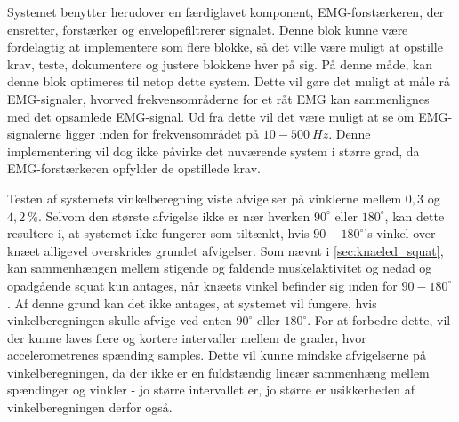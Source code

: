 
Systemet benytter herudover en færdiglavet komponent, EMG-forstærkeren, der ensretter, forstærker og envelopefiltrerer signalet. Denne blok kunne være fordelagtig at implementere som flere blokke, så det ville være muligt at opstille krav, teste, dokumentere og justere blokkene hver på sig. På denne måde, kan denne blok optimeres til netop dette system. Dette vil gøre det muligt at måle rå EMG-signaler, hvorved frekvensområderne for et råt EMG kan sammenlignes med det opsamlede EMG-signal. Ud fra dette vil det være muligt at se om EMG-signalerne ligger inden for frekvensområdet på $10-500~Hz$. Denne implementering vil dog ikke påvirke det nuværende system i større grad, da EMG-forstærkeren opfylder de opstillede krav. %

Testen af systemets vinkelberegning viste afvigelser på vinklerne mellem $0,3$ og $4,2~\%$. Selvom den største afvigelse ikke er nær hverken $90^{\circ}$ eller $180^{\circ}$, kan dette resultere i, at systemet ikke fungerer som tiltænkt, hvis $90-180^{\circ}$'s vinkel over knæet alligevel overskrides grundet afvigelser. Som nævnt i \autoref{sec:knaeled_squat}, kan sammenhængen mellem stigende og faldende muskelaktivitet og nedad og opadgående squat kun antages, når knæets vinkel befinder sig inden for $90-180^{\circ}$. Af denne grund kan det ikke antages, at systemet vil fungere, hvis vinkelberegningen skulle afvige ved enten $90^{\circ}$ eller $180^{\circ}$. For at forbedre dette, vil der kunne laves flere og kortere intervaller mellem de grader, hvor accelerometrenes spænding samples. Dette vil kunne mindske afvigelserne på vinkelberegningen, da der ikke er en fuldstændig lineær sammenhæng mellem spændinger og vinkler - jo større intervallet er, jo større er usikkerheden af vinkelberegningen derfor også.

